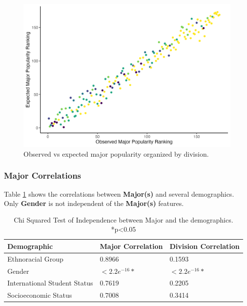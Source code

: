 \documentclass{article}
\begin{document}
\begin{figure}

{\centering \includegraphics[width=0.9\linewidth]{obs_vs_exp_majors} 

}

\caption{Observed vs expected major popularity organized by division.}\label{fig:obsvsexptopmajorsgraph}
\end{figure}

\subsubsection{Major Correlations}\label{major-correlations}

Table \ref{tab:major_chi_indep} shows the correlations between \textbf{Major(s)} and several demographics. Only \textbf{Gender} is not independent of the \textbf{Major(s)} features.

\begin{table}[htbp]
  \centering
  \begin{tabular}{|l|l|l|}
    \hline
    \textbf{Demographic} & \textbf{Major Correlation} & \textbf{Division Correlation} \\ \hline
    Ethnoracial Group & 0.8966 & 0.1593 \\ \hline
    Gender & $<2.2e^{-16}*$ & $<2.2e^{-16}*$ \\ \hline
    International Student Status & 0.7619 & 0.2205 \\ \hline
    Socioeconomic Status & 0.7008 & 0.3414 \\ \hline
  \end{tabular}
  \caption{Chi Squared Test of Independence between Major and the demographics. *p<0.05}
  \label{tab:major_chi_indep}
\end{table}
\end{document}
